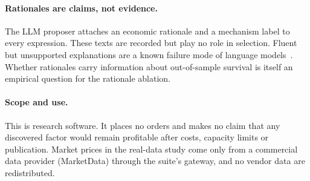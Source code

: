 \paragraph{Rationales are claims, not evidence.} The LLM proposer attaches an
economic rationale and a mechanism label to every expression. These texts
are recorded but play no role in selection. Fluent but unsupported
explanations are a known failure mode of language
models~\citep{ji2023hallucination}. Whether rationales carry information
about out-of-sample survival is itself an empirical question for the
rationale ablation. 

\paragraph{Scope and use.} This is research software. It places no orders
and makes no claim that any discovered factor would remain profitable after
costs, capacity limits or publication. Market prices in the real-data study
come only from a commercial data provider (MarketData) through the suite's
gateway, and no vendor data are redistributed.
